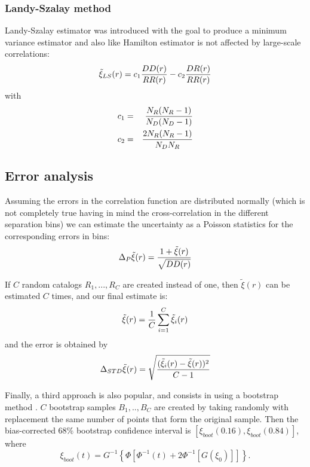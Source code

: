 \subsubsection*{Landy-Szalay method}
Landy-Szalay estimator \cite{cf:landy93} was introduced with the goal
to produce a minimum variance estimator and also like Hamilton
estimator is not affected by large-scale correlations:
\begin{equation}
\tilde \xi_{LS}(r) =  c_1 {  DD(r) \over  RR(r)}  -  c_2 { DR(r) \over 
RR(r)}
\label{ls_method}
\end{equation}
with
\begin{eqnarray}
c_1 & = & {N_R(N_R-1)\over   N_D(N_D-1)} \nonumber \\  
c_2 & = &  {2 N_R(N_R-1) \over N_D N_R}
\end{eqnarray}



\subsection{Error analysis}

Assuming the errors in the correlation function are distributed
normally (which is not completely true having in mind the
cross-correlation in the different separation bins) we can estimate the
uncertainty as a Poisson statistics for the corresponding errors in
bins:
\begin{equation}
\Delta_{P} \tilde \xi(r) = {1 + \tilde  \xi(r) \over \sqrt{DD(r)}}
\label{eq_pois}
\end{equation}

If $C$ random catalogs $R_1, ..., R_C$ are created instead of one,
then $\tilde \xi(r)$ can be estimated $C$ times, and our final
estimate is:
\begin{equation}
\tilde \xi(r) = {1 \over C }\sum_{i=1}^C \tilde \xi_i(r)
\end{equation}
and the error is obtained by
\begin{equation} 
\Delta_{STD} \tilde \xi(r) = \sqrt{ (\tilde \xi_i(r) -
  \tilde \xi(r))^2 \over C-1} 
\label{eq_std}
\end{equation}

Finally, a third approach is also popular, and consists in using a
bootstrap method \cite{cf:efron86}. $C$ bootstrap samples $B_1,..,B_C$
are created by taking randomly with replacement the same number of
points that form the original sample. Then the bias-corrected 68\%
bootstrap confidence interval is
$[\xi_{boot}(0.16),\xi_{boot}(0.84)]$, where
\begin{equation} \xi_{boot}(t) = G^{-1}\left\{\Phi\left[\Phi^{-1}(t) +
      2\Phi^{-1}\left[G(\xi_0)\right]\right]\right\}.  
\label{eq_boot}
\end{equation} 

